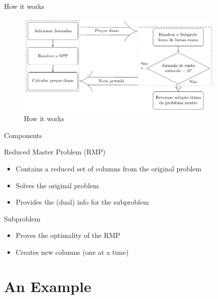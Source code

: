 \documentclass{beamer}
\begin{document}
\begin{frame}{How it works}
    \begin{figure}
        \centering
        \includegraphics[width=0.9\textwidth]{gercolumn.pdf}
        \caption{How it works}
        \label{fig:my_label}
    \end{figure}
\end{frame}

\begin{frame}{Components}
    \begin{minipage}{0.49\textwidth}
    Reduced Master Problem (RMP)
    \begin{itemize}
        \item Contains a reduced set of columns from the original problem
        \item Solves the original problem
        \item Provides the (dual) info for the subproblem
    \end{itemize}
    \end{minipage}
    \begin{minipage}{0.49\textwidth}
    Subproblem
    \begin{itemize}
        \item Proves the optimality of the RMP
        \item Creates new columns (one at a time)
    \end{itemize}
    \end{minipage}
\end{frame}

\section{An Example}
\end{document}
